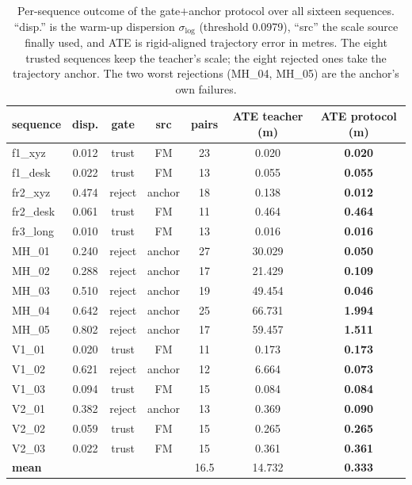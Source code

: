 \begin{table}[t]
\centering
\caption{Per-sequence outcome of the gate$+$anchor protocol over all sixteen
sequences. ``disp.'' is the warm-up dispersion $\sigma_{\log}$ (threshold
0.0979), ``src'' the scale source finally used, and ATE is rigid-aligned
trajectory error in metres. The eight trusted sequences keep the teacher's
scale; the eight rejected ones take the trajectory anchor. The two worst
rejections (MH\_04, MH\_05) are the anchor's own failures.}
\label{tab:protocol}
\footnotesize
\setlength{\tabcolsep}{6pt}
\begin{tabular}{@{}lcccccc@{}}
\toprule
sequence & disp. & gate & src & pairs & ATE teacher (m) & ATE protocol (m) \\
\midrule
f1\_xyz & 0.012 & trust & FM & 23 & 0.020 & \textbf{0.020} \\
f1\_desk & 0.022 & trust & FM & 13 & 0.055 & \textbf{0.055} \\
fr2\_xyz & 0.474 & reject & anchor & 18 & 0.138 & \textbf{0.012} \\
fr2\_desk & 0.061 & trust & FM & 11 & 0.464 & \textbf{0.464} \\
fr3\_long & 0.010 & trust & FM & 13 & 0.016 & \textbf{0.016} \\
MH\_01 & 0.240 & reject & anchor & 27 & 30.029 & \textbf{0.050} \\
MH\_02 & 0.288 & reject & anchor & 17 & 21.429 & \textbf{0.109} \\
MH\_03 & 0.510 & reject & anchor & 19 & 49.454 & \textbf{0.046} \\
MH\_04 & 0.642 & reject & anchor & 25 & 66.731 & \textbf{1.994} \\
MH\_05 & 0.802 & reject & anchor & 17 & 59.457 & \textbf{1.511} \\
V1\_01 & 0.020 & trust & FM & 11 & 0.173 & \textbf{0.173} \\
V1\_02 & 0.621 & reject & anchor & 12 & 6.664 & \textbf{0.073} \\
V1\_03 & 0.094 & trust & FM & 15 & 0.084 & \textbf{0.084} \\
V2\_01 & 0.382 & reject & anchor & 13 & 0.369 & \textbf{0.090} \\
V2\_02 & 0.059 & trust & FM & 15 & 0.265 & \textbf{0.265} \\
V2\_03 & 0.022 & trust & FM & 15 & 0.361 & \textbf{0.361} \\
\midrule
\textbf{mean} & & & & 16.5 & 14.732 & \textbf{0.333} \\
\bottomrule
\end{tabular}
\end{table}

